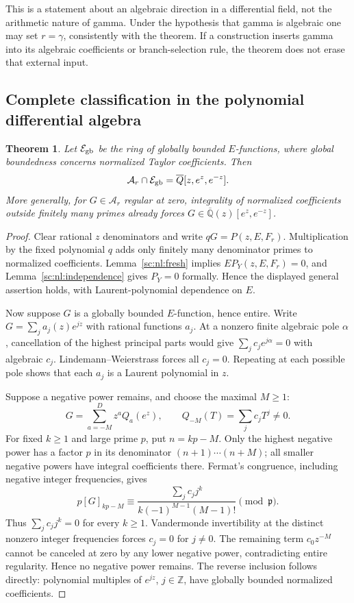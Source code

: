 \documentclass[11pt,a4paper]{article}
\newtheorem{theorem}{Theorem}[section]
\theoremstyle{definition}
\theoremstyle{remark}
\theoremstyle{plain}
\numberwithin{equation}{section}
\begin{document}
This is a statement about an algebraic direction in a differential
field, not the arithmetic nature of gamma. Under the hypothesis that
gamma is algebraic one may set $r=\gamma$, consistently with the theorem.
If a construction inserts gamma into its algebraic coefficients or
branch-selection rule, the theorem does not erase that external input.

\subsection{Complete classification in the polynomial differential algebra}

\begin{theorem}\label{sc:nl:classification}
Let $\mathcal E_{\rm gb}$ be the ring of globally bounded $E$-functions,
where global boundedness concerns normalized Taylor coefficients.
Then
\[
 \mathcal A_r\cap\mathcal E_{\rm gb}
 =\overline{\mathbb Q}[z,e^z,e^{-z}].
\]
More generally, for $G\in\mathcal A_r$ regular at zero, integrality of
normalized coefficients outside finitely many primes already forces
$G\in\overline{\mathbb Q}(z)[e^z,e^{-z}]$.
\end{theorem}
\begin{proof}
Clear rational $z$ denominators and write $qG=P(z,E,F_r)$.
Multiplication by the fixed polynomial $q$ adds only finitely many
denominator primes to normalized coefficients.
Lemma~\ref{sc:nl:fresh} implies $E P_Y(z,E,F_r)=0$, and
Lemma~\ref{sc:nl:independence} gives $P_Y=0$ formally. Hence the displayed
general assertion holds, with Laurent-polynomial dependence on $E$.

Now suppose $G$ is a globally bounded $E$-function, hence entire.
Write $G=\sum_j a_j(z)e^{jz}$ with rational functions $a_j$.
At a nonzero finite algebraic pole $\alpha$, cancellation of the
highest principal parts would give
$\sum_j c_j e^{j\alpha}=0$ with algebraic $c_j$.
Lindemann--Weierstrass forces all $c_j=0$. Repeating at each possible
pole shows that each $a_j$ is a Laurent polynomial in $z$.

Suppose a negative power remains, and choose the maximal $M\ge1$:
\[
 G=\sum_{a=-M}^D z^a Q_a(e^z),\qquad
 Q_{-M}(T)=\sum_j c_jT^j\ne0.
\]
For fixed $k\ge1$ and large prime $p$, put $n=kp-M$.
Only the highest negative power has a factor $p$ in its denominator
$(n+1)\cdots(n+M)$; all smaller negative powers have integral
coefficients there. Fermat's congruence, including negative integer
frequencies, gives
\[
 p[G]_{kp-M}\equiv
 \frac{\sum_j c_jj^k}{k(-1)^{M-1}(M-1)!}
 \pmod{\mathfrak p}.
\]
Thus $\sum_jc_jj^k=0$ for every $k\ge1$.
Vandermonde invertibility at the distinct nonzero integer frequencies
forces $c_j=0$ for $j\ne0$. The remaining term $c_0z^{-M}$ cannot be
canceled at zero by any lower negative power, contradicting entire
regularity. Hence no negative power remains.
The reverse inclusion follows directly: polynomial multiples of
$e^{jz}$, $j\in\mathbb Z$, have globally bounded normalized coefficients.
\end{proof}
\end{document}
